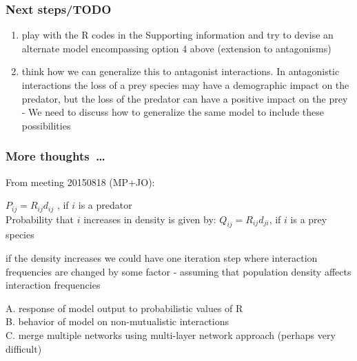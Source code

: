 \documentclass[12pt]{article}
\begin{document}
\subsubsection*{Next steps/TODO}

\begin{enumerate}

	\item play with the R codes in the Supporting information and try to devise an alternate model encompassing option 4 above (extension to antagonisms)
	
	\item think how we can generalize this to antagonist interactions. In antagonistic interactions the loss of a prey species may have a demographic impact on the predator, but the loss of the predator can have a positive impact on the prey - We need to discuss how to generalize the same model to include these possibilities
	
\end{enumerate}

\subsubsection*{More thoughts~\ldots}

From meeting 20150818 (MP+JO):

$P_{ij} = R_{ij} d_{ij}$ , if $i$ is a predator\\

Probability that $i$ increases in density is given by:
$Q_{ij} = R_{ij} d_{ji}$, if $i$ is a prey species 

if the density increases we could have one iteration step where interaction frequencies are changed by some factor - assuming that population density affects interaction frequencies



A. response of model output to probabilistic values of R\\
B. behavior of model on non-mutualistic interactions\\
C. merge multiple networks using multi-layer network approach (perhaps very difficult)
\end{document}
